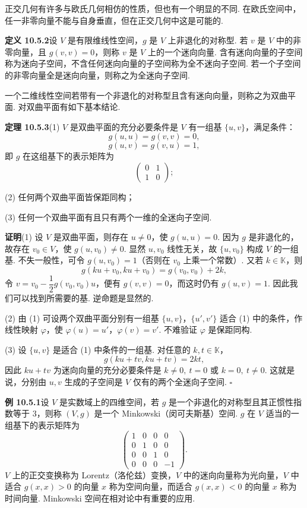 \documentclass[UTF8,12pt,a4paper,fontset=fandol]{ctexart}
\begin{document}
正交几何有许多与欧氏几何相仿的性质，但也有一个明显的不同. 在欧氏空间中，任一非零向量不能与自身垂直，但在正交几何中这是可能的.

\noindent\textbf{定义 10.5.2}\quad 设 $V$ 是有限维线性空间，$g$ 是 $V$ 上非退化的对称型. 若 $v$ 是 $V$ 中的非零向量，且 $g(v,v)=0$，则称 $v$ 是 $V$ 上的一个迷向向量. 含有迷向向量的子空间称为迷向子空间，不含任何迷向向量的子空间称为全不迷向子空间. 若一个子空间的非零向量全是迷向向量，则称之为全迷向子空间.

一个二维线性空间若带有一个非退化的对称型且含有迷向向量，则称之为双曲平面. 对双曲平面有如下基本结论.

\noindent\textbf{定理 10.5.3}\quad (1) $V$ 是双曲平面的充分必要条件是 $V$ 有一组基 $\{u,v\}$，满足条件：
\[
  g(u,u)=g(v,v)=0,
\]
\[
  g(u,v)=g(v,u)=1,
\]
即 $g$ 在这组基下的表示矩阵为
\[
  \left(\begin{array}{cc}
  0&1\\
  1&0
  \end{array}\right);
\]

(2) 任何两个双曲平面皆保距同构；

(3) 任何一个双曲平面有且只有两个一维的全迷向子空间.

\noindent\textbf{证明}\quad (1) 设 $V$ 是双曲平面，则存在 $u\ne0$，使 $g(u,u)=0$. 因为 $g$ 是非退化的，故存在 $v_0\in V$，使 $g(u,v_0)\ne0$. 显然 $u,v_0$ 线性无关，故 $\{u,v_0\}$ 构成 $V$ 的一组基. 不失一般性，可令 $g(u,v_0)=1$（否则在 $v_0$ 上乘一个常数）. 又若 $k\in\mathbb K$，则
\[
  g(ku+v_0,ku+v_0)=g(v_0,v_0)+2k,
\]
令 $v=v_0-\dfrac12g(v_0,v_0)u$，便有 $g(v,v)=0$，而这时仍有 $g(u,v)=1$. 因此我们可以找到所需要的基. 逆命题是显然的.

(2) 由 (1) 可设两个双曲平面分别有一组基 $\{u,v\}$，$\{u',v'\}$ 适合 (1) 中的条件，作线性映射 $\varphi$，使 $\varphi(u)=u'$，$\varphi(v)=v'$. 不难验证 $\varphi$ 是保距同构.

(3) 设 $\{u,v\}$ 是适合 (1) 中条件的一组基. 对任意的 $k,t\in\mathbb K$，
\[
  g(ku+tv,ku+tv)=2kt,
\]
因此 $ku+tv$ 为迷向向量的充分必要条件是 $k\ne0,\ t=0$ 或 $k=0,\ t\ne0$. 这就是说，分别由 $u,v$ 生成的子空间是 $V$ 仅有的两个全迷向子空间. $\square$

\noindent\textbf{例 10.5.1}\quad 设 $V$ 是实数域上的四维空间，若 $g$ 是一个非退化的对称型且其正惯性指数等于 3，则称 $(V,g)$ 是一个 Minkowski（闵可夫斯基）空间. $g$ 在 $V$ 适当的一组基下的表示矩阵为
\[
  \left(\begin{array}{rrrr}
  1&0&0&0\\
  0&1&0&0\\
  0&0&1&0\\
  0&0&0&-1
  \end{array}\right).
\]
$V$ 上的正交变换称为 Lorentz（洛伦兹）变换，$V$ 中的迷向向量称为光向量，$V$ 中适合 $g(x,x)>0$ 的向量 $x$ 称为空间向量，而适合 $g(x,x)<0$ 的向量 $x$ 称为时间向量. Minkowski 空间在相对论中有重要的应用.
\end{document}
